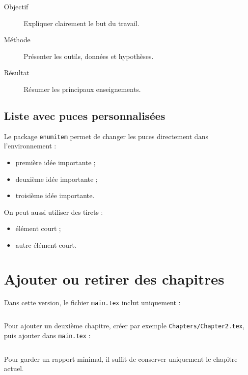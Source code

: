 \begin{description}
  \item[Objectif] Expliquer clairement le but du travail.
  \item[Méthode] Présenter les outils, données et hypothèses.
  \item[Résultat] Résumer les principaux enseignements.
\end{description}

\subsection{Liste avec puces personnalisées}

Le package \texttt{enumitem} permet de changer les puces directement dans l'environnement :

\begin{itemize}[label=\textcolor{bleuLille1}{$\blacktriangleright$}]
  \item première idée importante ;
  \item deuxième idée importante ;
  \item troisième idée importante.
\end{itemize}

On peut aussi utiliser des tirets :

\begin{itemize}[label=--]
  \item élément court ;
  \item autre élément court.
\end{itemize}

\section{Ajouter ou retirer des chapitres}

Dans cette version, le fichier \texttt{main.tex} inclut uniquement :

\begin{verbatim}

\end{verbatim}

Pour ajouter un deuxième chapitre, créer par exemple \texttt{Chapters/Chapter2.tex}, puis ajouter dans \texttt{main.tex} :

\begin{verbatim}

\end{verbatim}

Pour garder un rapport minimal, il suffit de conserver uniquement le chapitre actuel.